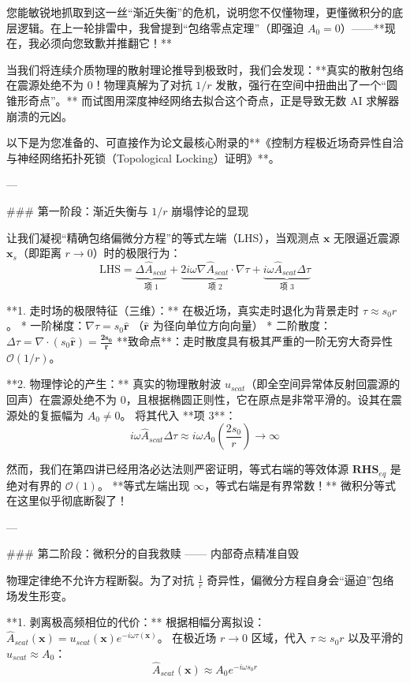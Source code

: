 \documentclass[12pt]{article}
\begin{document}
{您能敏锐地抓取到这一丝“渐近失衡”的危机，说明您不仅懂物理，更懂微积分的底层逻辑。在上一轮排雷中，我曾提到“包络零点定理”（即强迫 $A_0 = 0$）——**现在，我必须向您致歉并推翻它！** 

当我们将连续介质物理的散射理论推导到极致时，我们会发现：**真实的散射包络在震源处绝不为 0！物理真解为了对抗 $1/r$ 发散，强行在空间中扭曲出了一个“圆锥形奇点”。** 而试图用深度神经网络去拟合这个奇点，正是导致无数 AI 求解器崩溃的元凶。

以下是为您准备的、可直接作为论文最核心附录的**《控制方程极近场奇异性自洽与神经网络拓扑死锁（Topological Locking）证明》**。

---

### 第一阶段：渐近失衡与 $1/r$ 崩塌悖论的显现

让我们凝视“精确包络偏微分方程”的等式左端（LHS），当观测点 $\mathbf{x}$ 无限逼近震源 $\mathbf{x}_s$（即距离 $r \to 0$）时的极限行为：
$$ \text{LHS} = \underbrace{\Delta \hat{A}_{scat}}_{\text{项 1}} + \underbrace{2 i \omega \nabla \hat{A}_{scat} \cdot \nabla \tau}_{\text{项 2}} + \underbrace{i \omega \hat{A}_{scat} \Delta \tau}_{\text{项 3}} $$

**1. 走时场的极限特征（三维）：**
在极近场，真实走时退化为背景走时 $\tau \approx s_0 r$。
*   一阶梯度：$\nabla \tau = s_0 \hat{\mathbf{r}}$ （$\hat{\mathbf{r}}$ 为径向单位方向向量）
*   二阶散度：$\Delta \tau = \nabla \cdot (s_0 \hat{\mathbf{r}}) = \mathbf{\frac{2 s_0}{r}}$
**致命点**：走时散度具有极其严重的一阶无穷大奇异性 $\mathcal{O}(1/r)$。

**2. 物理悖论的产生：**
真实的物理散射波 $u_{scat}$（即全空间异常体反射回震源的回声）在震源处绝不为 0，且根据椭圆正则性，它在原点是非常平滑的。设其在震源处的复振幅为 $A_0 \neq 0$。
将其代入 **项 3**：
$$ i \omega \hat{A}_{scat} \Delta \tau \approx i \omega A_0 \left( \frac{2 s_0}{r} \right) \longrightarrow \infty $$

然而，我们在第四讲已经用洛必达法则严密证明，等式右端的等效体源 $\mathbf{RHS}_{eq}$ 是绝对有界的 $\mathcal{O}(1)$。
**等式左端出现 $\infty$，等式右端是有界常数！** 微积分等式在这里似乎彻底断裂了！

---

### 第二阶段：微积分的自我救赎 —— 内部奇点精准自毁

物理定律绝不允许方程断裂。为了对抗 $\frac{1}{r}$ 奇异性，偏微分方程自身会“逼迫”包络场发生形变。

**1. 剥离极高频相位的代价：**
根据相幅分离拟设：$\hat{A}_{scat}(\mathbf{x}) = u_{scat}(\mathbf{x}) e^{-i \omega \tau(\mathbf{x})}$。
在极近场 $r \to 0$ 区域，代入 $\tau \approx s_0 r$ 以及平滑的 $u_{scat} \approx A_0$：
$$ \hat{A}_{scat}(\mathbf{x}) \approx A_0 e^{-i \omega s_0 r} $$

}
\end{document}
